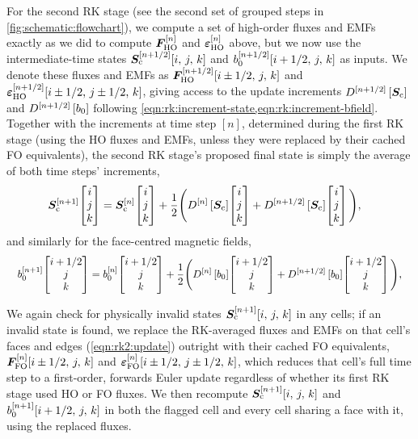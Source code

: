 For the second RK stage (see the second set of grouped steps in \cref{fig:schematic:flowchart}), we compute a set of high-order fluxes and EMFs exactly as we did to compute $\bm{F}_\mathrm{HO}^{[n]}$ and $\bm{\varepsilon}_\mathrm{HO}^{[n]}$ above, but we now use the intermediate-time states $\bm{S}_\mathrm{c}^{[n + 1/2]}\!\left[ i,\,j,\,k \right]$ and $b_0^{[n + 1/2]}\!\left[ i + 1/2,\,j,\,k \right]$ as inputs. We denote these fluxes and EMFs as $\bm{F}_\mathrm{HO}^{[n + 1/2]}\!\left[ i \pm 1/2,\,j,\,k \right]$ and $\bm{\varepsilon}_\mathrm{HO}^{[n + 1/2]}\!\left[ i \pm 1/2,\,j \pm 1/2,\,k \right]$, giving access to the update increments $D^{[n + 1/2]}\left[ \bm{S}_\mathrm{c} \right]$ and $D^{[n + 1/2]}\left[ b_0 \right]$ following \cref{eqn:rk:increment-state,eqn:rk:increment-bfield}. Together with the increments at time step $[n]$, determined during the first RK stage (using the HO fluxes and EMFs, unless they were replaced by their cached FO equivalents), the second RK stage's proposed final state is simply the average of both time steps' increments,
\begin{align}
    \bm{S}_\mathrm{c}^{[n + 1]}\!\begin{bmatrix}i\\j\\k\end{bmatrix}
        = \bm{S}_\mathrm{c}^{[n]}\!\begin{bmatrix}i\\j\\k\end{bmatrix}
            &+ \frac{1}{2}\Bigg(
            D^{[n]}\left[ \bm{S}_\mathrm{c} \right]\!\begin{bmatrix}i\\j\\k\end{bmatrix}
            + D^{[n + 1/2]}\left[ \bm{S}_\mathrm{c} \right]\!\begin{bmatrix}i\\j\\k\end{bmatrix}
        \Bigg)
    ,
\end{align}
and similarly for the face-centred magnetic fields,
\begin{align}
    \scalebox{0.925}{$\displaystyle
    b_0^{[n + 1]}\EvalAtV{i + 1/2}{j}{k}
        = b_0^{[n]}\EvalAtV{i + 1/2}{j}{k}
            + \frac{1}{2}\Bigg(
            D^{[n]}\sbrac{b_0}\EvalAtV{i + 1/2}{j}{k}
            + D^{[n + 1/2]}\sbrac{b_0}\EvalAtV{i + 1/2}{j}{k}
        \Bigg)
    $}, \label{eqn:rk2:update}
\end{align}

We again check for physically invalid states $\bm{S}_\mathrm{c}^{[n + 1]}\!\left[ i,\,j,\,k \right]$ in any cells; if an invalid state is found, we replace the RK-averaged fluxes and EMFs on that cell's faces and edges (\cref{eqn:rk2:update}) outright with their cached FO equivalents, $\bm{F}_\mathrm{FO}^{[n]}\!\left[ i \pm 1/2,\,j,\,k \right]$ and $\bm{\varepsilon}_\mathrm{FO}^{[n]}\!\left[ i \pm 1/2,\,j \pm 1/2,\,k \right]$, which reduces that cell's full time step to a first-order, forwards Euler update regardless of whether its first RK stage used HO or FO fluxes. We then recompute $\bm{S}_\mathrm{c}^{[n + 1]}\!\left[ i,\,j,\,k \right]$ and $b_0^{[n + 1]}\!\left[ i + 1/2,\,j,\,k \right]$ in both the flagged cell and every cell sharing a face with it, using the replaced fluxes.

